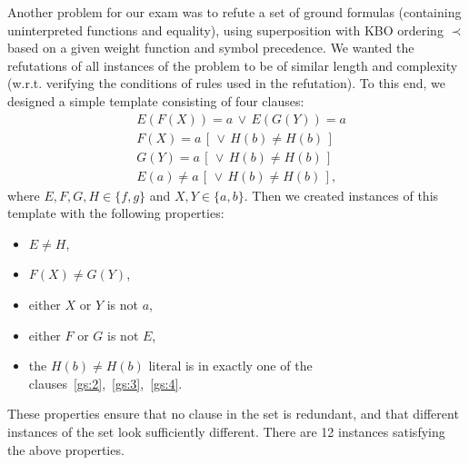 Another problem for our exam was to refute a set of ground formulas
(containing uninterpreted functions and equality),
using superposition with KBO ordering $\prec$ based on
a given weight function and symbol precedence.
We wanted the refutations of all instances of the problem to be
of similar length and complexity (w.r.t. verifying the conditions
of rules used in the refutation). To this end, we designed a simple
template consisting of four clauses:
\begin{align}
  &E(F(X)) = a \,\lor\, E(G(Y)) = a \label{gs:1} \\
  &F(X) = a \,[\, \lor\, H(b) \not= H(b) \,] \label{gs:2} \\
  &G(Y) = a \,[\, \lor\, H(b) \not= H(b) \,] \label{gs:3} \\
  &E(a) \not= a \,[\, \lor\, H(b) \not= H(b) \,] \label{gs:4},
\end{align}
where $E, F, G, H \in \{f, g\}$ and $X, Y \in \{a, b\}$.
%
Then we created
instances of this template with the following properties:
\begin{itemize}
  \item $E \not = H$,
  \item $F(X) \not = G(Y)$,
  \item either $X$ or $Y$ is not $a$,
  \item either $F$ or $G$ is not $E$,
  \item the $H(b) \not = H(b)$ literal is in exactly one of the
    clauses~\eqref{gs:2},~\eqref{gs:3},~\eqref{gs:4}.
\end{itemize}
These properties ensure that no clause in the set is redundant,
and that different instances of the set look sufficiently different.
There are 12 instances satisfying the above properties.
%

